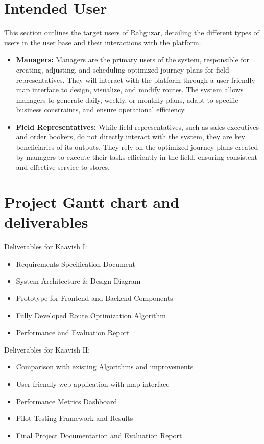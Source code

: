 \section{Intended User}

This section outlines the target users of Rahguzar, detailing the different types of users in the user base and their interactions with the platform.
\begin{itemize}

         \item \textbf{Managers:} Managers are the primary users of the system, responsible for creating, adjusting, and scheduling optimized journey plans for field representatives. They will interact with the platform through a user-friendly map interface to design, visualize, and modify routes. The system allows managers to generate daily, weekly, or monthly plans, adapt to specific business constraints, and ensure operational efficiency.
         \item \textbf{Field Representatives:} While field representatives, such as sales executives and order bookers, do not directly interact with the system, they are key beneficiaries of its outputs. They rely on the optimized journey plans created by managers to execute their tasks efficiently in the field, ensuring consistent and effective service to stores.

\end{itemize}


\section{Project Gantt chart and deliverables}

Deliverables for Kaavish I:
\begin{itemize}
    \item Requirements Specification Document
    \item System Architecture \& Design Diagram
    \item Prototype for Frontend and Backend Components
    \item Fully Developed Route Optimization Algorithm
    \item Performance and Evaluation Report
\end{itemize}
Deliverables for Kaavish II:
\begin{itemize}
    \item Comparison with existing Algorithms and improvements
    \item User-friendly web application with map interface
    \item Performance Metrics Dashboard
    \item Pilot Testing Framework and Results
    \item Final Project Documentation and Evaluation Report
\end{itemize}




